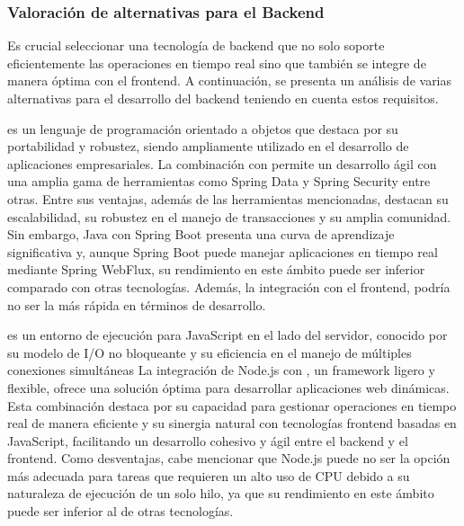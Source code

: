 \subsubsection{Valoración de alternativas para el Backend}
Es crucial seleccionar una tecnología de backend que no solo soporte eficientemente las operaciones en tiempo real sino que también se integre de manera óptima con el frontend.
A continuación, se presenta un análisis de varias alternativas para el desarrollo del backend teniendo en cuenta estos requisitos.

 es un lenguaje de programación orientado a objetos que destaca por su portabilidad y robustez, siendo ampliamente utilizado en el desarrollo de aplicaciones empresariales. 
La combinación con  permite un desarrollo ágil con una amplia gama de herramientas como Spring Data y Spring Security entre otras. 
Entre sus ventajas, además de las herramientas mencionadas, destacan su escalabilidad, su robustez en el manejo de transacciones y su amplia comunidad. 
Sin embargo, Java con Spring Boot presenta una curva de aprendizaje significativa y, aunque Spring Boot puede manejar aplicaciones en tiempo real mediante Spring WebFlux, su rendimiento en este ámbito puede ser inferior comparado con otras tecnologías. Además, la integración con el frontend, podría no ser la más rápida en términos de desarrollo.

 es un entorno de ejecución para JavaScript en el lado del servidor, conocido por su modelo de I/O no bloqueante y su eficiencia en el manejo de múltiples conexiones simultáneas
La integración de Node.js con , un framework ligero y flexible, ofrece una solución óptima para desarrollar aplicaciones web dinámicas.
Esta combinación destaca por su capacidad para gestionar operaciones en tiempo real de manera eficiente y su sinergia natural con tecnologías frontend basadas en JavaScript, facilitando un desarrollo cohesivo y ágil entre el backend y el frontend.
Como desventajas, cabe mencionar que Node.js puede no ser la opción más adecuada para tareas que requieren un alto uso de CPU debido a su naturaleza de ejecución de un solo hilo, ya que su rendimiento en este ámbito puede ser inferior al de otras tecnologías.

